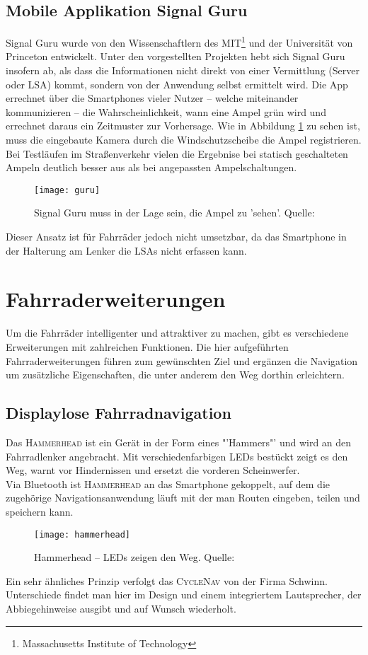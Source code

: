 \subsection*{Mobile Applikation Signal Guru}
Signal Guru wurde von den Wissenschaftlern des MIT\footnote{ Massachusetts Institute of Technology} und der Universität von Princeton entwickelt. Unter den vorgestellten Projekten hebt sich Signal Guru insofern ab, als dass die Informationen nicht direkt von einer Vermittlung (Server oder \gls{LSA}) kommt, sondern von der Anwendung selbst ermittelt wird. Die \Gls{App} errechnet über die \glspl{Smartphone} vieler Nutzer -- welche miteinander kommunizieren -- die Wahrscheinlichkeit, wann eine Ampel grün wird und errechnet daraus ein Zeitmuster zur Vorhersage. Wie in Abbildung \ref{fig:AppSignalGuru} zu sehen ist, muss die eingebaute Kamera durch die Windschutzscheibe die Ampel registrieren. Bei Testläufen im Straßenverkehr vielen die Ergebnise bei statisch geschalteten Ampeln deutlich besser aus als bei angepassten Ampelschaltungen. \cite{SignalGuruPaper}\\ 
\begin{figure}[H]
    \centering
    \texttt{[image: guru]}
    \grayRule
    \caption[Signal Guru]{Signal Guru muss in der Lage sein, die Ampel zu 'sehen'.  Quelle: \cite{SignalGuruPaper}} \label{fig:AppSignalGuru}
\end{figure}
Dieser Ansatz ist für Fahrräder jedoch nicht umsetzbar, da das \gls{Smartphone} in der Halterung am Lenker die \glspl{LSA} nicht erfassen kann.
%
%
\clearpage
\section{Fahrraderweiterungen}
Um die Fahrräder intelligenter und attraktiver zu machen, gibt es verschiedene Erweiterungen mit zahlreichen Funktionen. Die hier aufgeführten Fahrraderweiterungen führen zum gewünschten Ziel und ergänzen die Navigation um zusätzliche Eigenschaften, die unter anderem den Weg dorthin erleichtern.
\subsection{Displaylose Fahrradnavigation}
Das \textsc{Hammerhead} ist ein Gerät in der Form eines "'Hammers"' und wird an den Fahrradlenker angebracht. Mit verschiedenfarbigen \glspl{LED} bestückt zeigt es den Weg, warnt vor Hindernissen und ersetzt die vorderen Scheinwerfer.\\
Via Bluetooth ist \textsc{Hammerhead} an das \gls{Smartphone} gekoppelt, auf dem die zugehörige Navigationsanwendung läuft mit der man Routen eingeben, teilen und speichern kann. \cite{Hammerhead}\\
\begin{figure}[H]
    \centering
    \texttt{[image: hammerhead]}
    \grayRule
    \caption[Hammerhead]{Hammerhead -- \glspl{LED} zeigen den Weg.  Quelle: \cite{Hammerhead}} 
    \label{fig:hammerhead}
\end{figure}
Ein sehr ähnliches Prinzip verfolgt das \textsc{CycleNav} von der Firma Schwinn. Unterschiede findet man hier im Design und einem integriertem Lautsprecher, der Abbiegehinweise ausgibt und auf Wunsch wiederholt. \cite{CycleNav}
